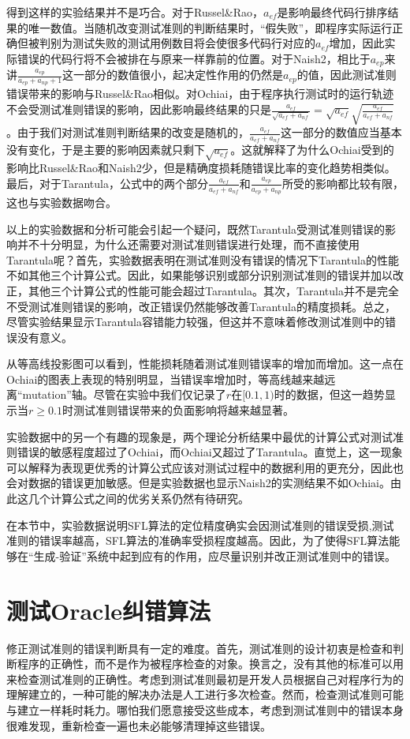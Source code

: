 得到这样的实验结果并不是巧合。对于Russel\&Rao，$a_{ef}$是影响最终代码行排序结果的唯一数值。当随机改变测试准则的判断结果时，“假失败”，即程序实际运行正确但被判别为测试失败的测试用例数目将会使很多代码行对应的$a_{ef}$增加，因此实际错误的代码行将不会被排在与原来一样靠前的位置。对于Naish2，相比于$a_{ep}$来讲$\frac{a_{ep}}{a_{ep} + a_{np} + 1}$这一部分的数值很小，起决定性作用的仍然是$a_{ep}$的值，因此测试准则错误带来的影响与Russel\&Rao相似。对Ochiai，由于程序执行测试时的运行轨迹不会受测试准则错误的影响，因此影响最终结果的只是$\frac{a_{ef}}{\sqrt{a_{ef} + a_{nf}}} = \sqrt{a_{ef}}\sqrt{\frac{a_{ef}}{a_{ef} + a_{nf}}}$。由于我们对测试准则判断结果的改变是随机的，$\frac{a_{ef}}{a_{ef} + a_{nf}}$这一部分的数值应当基本没有变化，于是主要的影响因素就只剩下$\sqrt{a_{ef}}$。这就解释了为什么Ochiai受到的影响比Russel\&Rao和Naish2少，但是精确度损耗随错误比率的变化趋势相类似。最后，对于Tarantula，公式中的两个部分$\frac{a_{ef}}{a_{ef} + a_{nf}}$和$\frac{a_{ep}}{a_{ep} + a_{np}}$所受的影响都比较有限，这也与实验数据吻合。

以上的实验数据和分析可能会引起一个疑问，既然Tarantula受测试准则错误的影响并不十分明显，为什么还需要对测试准则错误进行处理，而不直接使用Tarantula呢？首先，实验数据表明在测试准则没有错误的情况下Tarantula的性能不如其他三个计算公式。因此，如果能够识别或部分识别测试准则的错误并加以改正，其他三个计算公式的性能可能会超过Tarantula。其次，Tarantula并不是完全不受测试准则错误的影响，改正错误仍然能够改善Tarantula的精度损耗。总之，尽管实验结果显示Tarantula容错能力较强，但这并不意味着修改测试准则中的错误没有意义。

从等高线投影图可以看到，性能损耗随着测试准则错误率的增加而增加。这一点在Ochiai的图表上表现的特别明显，当错误率增加时，等高线越来越远离“mutation”轴。尽管在实验中我们仅记录了$r$在$[0.1,1)$时的数据，但这一趋势显示当$r \ge 0.1$时测试准则错误带来的负面影响将越来越显著。

实验数据中的另一个有趣的现象是，两个理论分析结果中最优的计算公式对测试准则错误的敏感程度超过了Ochiai，而Ochiai又超过了Tarantula。直觉上，这一现象可以解释为表现更优秀的计算公式应该对测试过程中的数据利用的更充分，因此也会对数据的错误更加敏感。但是实验数据也显示Naish2的实测结果不如Ochiai。由此这几个计算公式之间的优劣关系仍然有待研究。

在本节中，实验数据说明SFL算法的定位精度确实会因测试准则的错误受损,测试准则的错误率越高，SFL算法的准确率受损程度越高。因此，为了使得SFL算法能够在“生成-验证”系统中起到应有的作用，应尽量识别并改正测试准则中的错误。

\section{测试Oracle纠错算法}
修正测试准则的错误判断具有一定的难度。首先，测试准则的设计初衷是检查和判断程序的正确性，而不是作为被程序检查的对象。换言之，没有其他的标准可以用来检查测试准则的正确性。考虑到测试准则最初是开发人员根据自己对程序行为的理解建立的，一种可能的解决办法是人工进行多次检查。然而，检查测试准则可能与建立一样耗时耗力。哪怕我们愿意接受这些成本，考虑到测试准则中的错误本身很难发现，重新检查一遍也未必能够清理掉这些错误。

